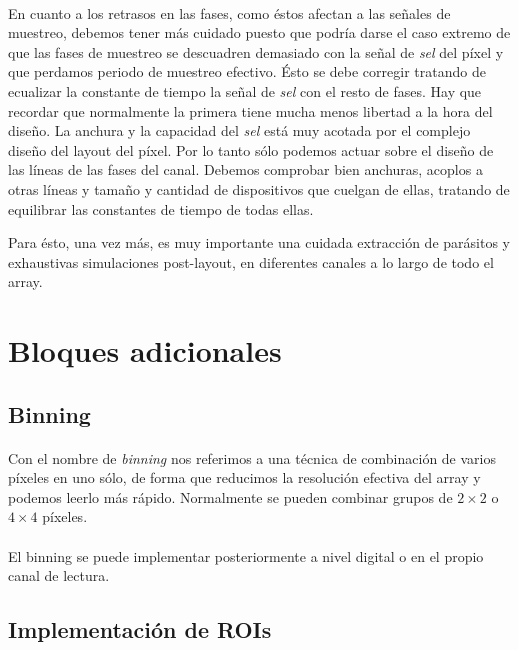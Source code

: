 \paragraph{}
En cuanto a los retrasos en las fases, como éstos afectan a las señales de
muestreo, debemos tener más cuidado puesto que podría darse el caso extremo de
que las fases de muestreo se descuadren demasiado con la señal de \textit{sel} del
píxel y que perdamos periodo de muestreo efectivo. Ésto se debe corregir tratando
de ecualizar la constante de tiempo la señal de \textit{sel} con el resto de
fases. Hay que recordar que normalmente la primera tiene mucha menos libertad a la
hora del diseño. La anchura y la capacidad del \textit{sel} está muy acotada
por el complejo diseño del layout del píxel. Por lo tanto sólo podemos actuar
sobre el diseño de las líneas de las fases del canal. Debemos comprobar bien
anchuras, acoplos a otras líneas y tamaño y cantidad de dispositivos que cuelgan
de ellas, tratando de equilibrar las constantes de tiempo de todas ellas.

Para ésto, una vez más, es muy importante una cuidada extracción de parásitos y
exhaustivas simulaciones post-layout, en diferentes canales a lo largo de todo el
array.

\section{Bloques adicionales}

\subsection{Binning}

\paragraph{}
Con el nombre de \textit{binning} nos referimos a una técnica de combinación de
varios píxeles en uno sólo, de forma que reducimos la resolución efectiva del
array y podemos leerlo más rápido. Normalmente se pueden combinar grupos de
$2\times 2$ o $4\times 4$ píxeles.

\paragraph{}
El binning se puede implementar posteriormente a nivel digital o en el propio
canal de lectura.

\subsection{Implementación de ROIs}

